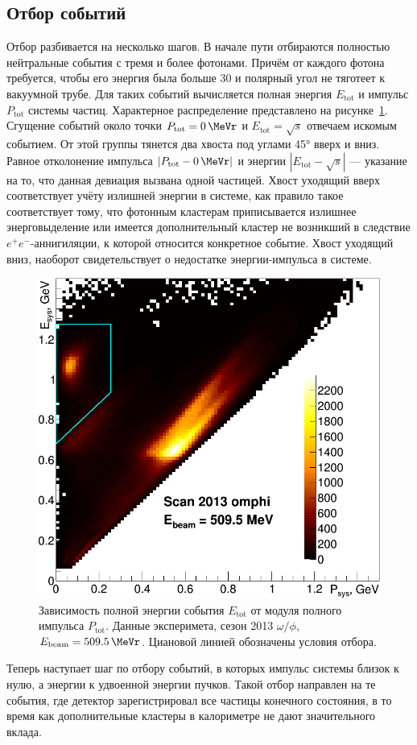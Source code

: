 \subsection{Отбор событий}

Отбор разбивается на несколько шагов. В начале пути отбираются полностью нейтральные события с тремя и более фотонами.
Причём от каждого фотона требуется, чтобы его энергия была больше \SI{30}{\MeVr} и полярный угол не тяготеет к вакуумной трубе.
Для таких событий вычисляется полная энергия $E_{\text{tot}}$ и импульс $P_{\text{tot}}$ системы частиц.
Характерное распределение представлено на рисунке~\ref{fig:EtvsPt5095}.
Сгущение событий около точки $P_{\text{tot}} = \SI{0}{\MeVr}$ и $E_{\text{tot}} = \sqrt{s}$ отвечаем искомым событием.
От этой группы тянется два хвоста под углами \ang{45} вверх и вниз.
Равное отколонение импульса $|P_{\text{tot}} - \SI{0}{\MeVr}|$ и энергии $|E_{\text{tot}} - \sqrt{s}|$
---
указание на то,
что данная девиация вызвана одной частицей.
Хвост уходящий вверх соответствует учёту излишней энергии в системе,
как правило такое соответствует тому,
что фотонным кластерам приписывается излишнее энерговыделение или имеется дополнительный кластер не возникший в следствие $e^+e^-$-аннигиляции,
к которой относится конкретное событие.
Хвост уходящий вниз, наоборот свидетельствует о недостатке энергии-импульса в системе.

\begin{figure}
	\centering
	\label{fig:EtvsPt5095}
	\includegraphics[width=.5\textwidth]{img/EtvsPt5095.png}
	\caption{Зависимость полной энергии события $E_{\text{tot}}$ от модуля полного импульса $P_{\text{tot}}$.
		Данные эксперимета, сезон 2013 $\omega / \phi$, $E_{\text{beam}} = \SI{509.5}{\MeVr}$.
		Циановой линией обозначены условия отбора.}
\end{figure}

Теперь наступает шаг по отбору событий, в которых импульс системы близок к нулю,
а энергии к удвоенной энергии пучков.
Такой отбор направлен на те события,
где детектор зарегистрировал все частицы конечного состояния,
в то время как дополнительные кластеры в калориметре не дают значительного вклада.

